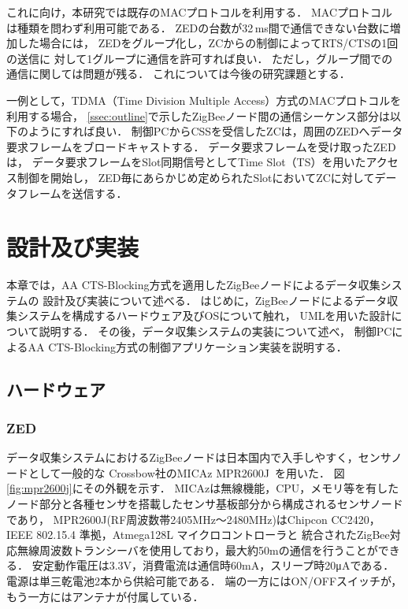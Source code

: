 \documentclass[12pt]{jreport}
\begin{document}
これに向け，本研究では既存のMACプロトコルを利用する．
MACプロトコルは種類を問わず利用可能である．
ZEDの台数が32\,ms間で通信できない台数に増加した場合には，
ZEDをグループ化し，ZCからの制御によってRTS/CTSの1回の送信に
対して1グループに通信を許可すれば良い．
ただし，グループ間での通信に関しては問題が残る．
これについては今後の研究課題とする．

一例として，TDMA（Time Division Multiple Access）方式のMACプロトコルを利用する場合，
\ref{ssec:outline}で示したZigBeeノード間の通信シーケンス部分は以下のようにすれば良い．
制御PCからCSSを受信したZCは，周囲のZEDへデータ要求フレームをブロードキャストする．
データ要求フレームを受け取ったZEDは，
データ要求フレームをSlot同期信号としてTime Slot（TS）を用いたアクセス制御を開始し，
ZED毎にあらかじめ定められたSlotにおいてZCに対してデータフレームを送信する．

\chapter{設計及び実装}
\label{imple}

本章では，AA CTS-Blocking方式を適用したZigBeeノードによるデータ収集システムの
設計及び実装について述べる．
はじめに，ZigBeeノードによるデータ収集システムを構成するハードウェア及びOSについて触れ，
UMLを用いた設計について説明する．
その後，データ収集システムの実装について述べ，
制御PCによるAA CTS-Blocking方式の制御アプリケーション実装を説明する．


\section{ハードウェア}

\subsection{ZED}

データ収集システムにおけるZigBeeノードは日本国内で入手しやすく，センサノードとして一般的な
Crossbow社のMICAz MPR2600J~\cite{Product/crossbow:micaz}を用いた．
図\ref{fig:mpr2600j}にその外観を示す．
MICAzは無線機能，CPU，メモリ等を有したノード部分と各種センサを搭載したセンサ基板部分から構成されるセンサノードであり，
MPR2600J(RF周波数帯2405MHz～2480MHz)はChipcon CC2420，IEEE 802.15.4 準拠，Atmega128L マイクロコントローラと
統合されたZigBee対応無線周波数トランシーバを使用しており，最大約50mの通信を行うことができる．
安定動作電圧は3.3V，消費電流は通信時60mA，スリープ時20μAである．
電源は単三乾電池2本から供給可能である．
端の一方にはON/OFFスイッチが，もう一方にはアンテナが付属している．
\end{document}
